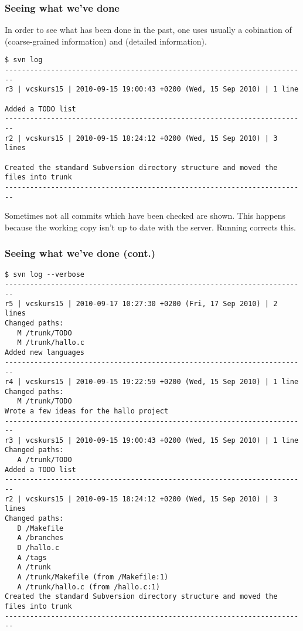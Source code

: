 \begin{frame}[fragile]
    \frametitle{Seeing what we've done}
    \linuxframe

    In order to see what has been done in the past, one uses usually a
    cobination of  (coarse-grained information) and
     (detailed information).

\begin{lstlisting}[basicstyle=\tiny\ttfamily\color{black}]
$ svn log
------------------------------------------------------------------------
r3 | vcskurs15 | 2010-09-15 19:00:43 +0200 (Wed, 15 Sep 2010) | 1 line

Added a TODO list
------------------------------------------------------------------------
r2 | vcskurs15 | 2010-09-15 18:24:12 +0200 (Wed, 15 Sep 2010) | 3 lines

Created the standard Subversion directory structure and moved the files into trunk
------------------------------------------------------------------------
\end{lstlisting}

Sometimes not all commits which have been checked are shown.  This happens
because the working copy isn't up to date with the server.  Running 
 corrects this.
\end{frame}

\begin{frame}[fragile]
    \frametitle{Seeing what we've done (cont.)}
    \linuxframe
    \vspace*{-3mm}
\begin{lstlisting}[basicstyle=\tiny\ttfamily\color{black}]
$ svn log --verbose
------------------------------------------------------------------------
r5 | vcskurs15 | 2010-09-17 10:27:30 +0200 (Fri, 17 Sep 2010) | 2 lines
Changed paths:
   M /trunk/TODO
   M /trunk/hallo.c
Added new languages
------------------------------------------------------------------------
r4 | vcskurs15 | 2010-09-15 19:22:59 +0200 (Wed, 15 Sep 2010) | 1 line
Changed paths:
   M /trunk/TODO
Wrote a few ideas for the hallo project
------------------------------------------------------------------------
r3 | vcskurs15 | 2010-09-15 19:00:43 +0200 (Wed, 15 Sep 2010) | 1 line
Changed paths:
   A /trunk/TODO
Added a TODO list
------------------------------------------------------------------------
r2 | vcskurs15 | 2010-09-15 18:24:12 +0200 (Wed, 15 Sep 2010) | 3 lines
Changed paths:
   D /Makefile
   A /branches
   D /hallo.c
   A /tags
   A /trunk
   A /trunk/Makefile (from /Makefile:1)
   A /trunk/hallo.c (from /hallo.c:1)
Created the standard Subversion directory structure and moved the files into trunk
------------------------------------------------------------------------
\end{lstlisting}
\end{frame}

